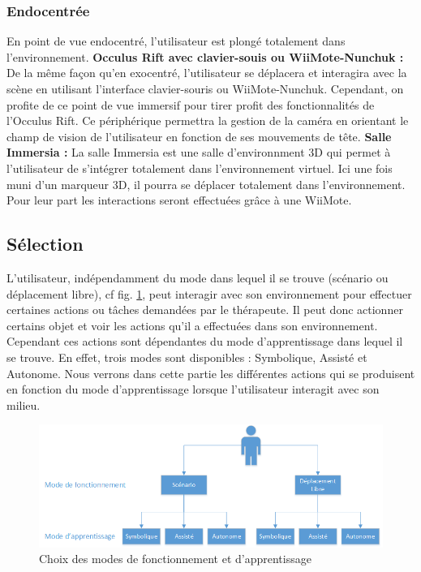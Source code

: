 \subsubsection{Endocentrée}
En point de vue endocentré, l'utilisateur est plongé totalement dans l'environnement.
\newline
\textbf{Occulus Rift avec clavier-souis ou WiiMote-Nunchuk : }
De la même façon qu'en exocentré, l'utilisateur se déplacera et interagira avec la scène en utilisant l'interface clavier-souris ou WiiMote-Nunchuk. Cependant, on profite de ce point de vue immersif pour tirer profit des fonctionnalités de l'Occulus Rift.
Ce périphérique permettra la gestion de la caméra en orientant le champ de vision de l'utilisateur en fonction de ses mouvements de tête.
\newline
\textbf{Salle Immersia : }
La salle Immersia est une salle d'environnment 3D qui permet à l'utilisateur de s'intégrer totalement dans l'environnement virtuel. Ici une fois muni d'un marqueur 3D, il pourra se déplacer totalement dans l'environnement.
Pour leur part les interactions seront effectuées grâce à une WiiMote.

\subsection{Sélection}

L'utilisateur, indépendamment du mode dans lequel il se trouve (scénario ou déplacement libre), cf fig. \ref{fig:modes}, peut interagir avec son environnement pour effectuer certaines actions ou tâches demandées par le thérapeute. Il peut donc actionner certains objet et voir les actions qu'il a effectuées dans son environnement. Cependant ces actions sont dépendantes du mode d'apprentissage dans lequel il se trouve. En effet, trois modes sont disponibles : Symbolique, Assisté et Autonome. Nous verrons dans cette partie les différentes actions qui se produisent en fonction du mode d'apprentissage lorsque l'utilisateur interagit avec son milieu.

\begin{figure}[h]
  \centering
  \includegraphics[width=1\textwidth]{2-Specifications/img-utilisateur/modes.png}
  \caption{\label{fig:modes} Choix des modes de fonctionnement et d'apprentissage}
\end{figure}


